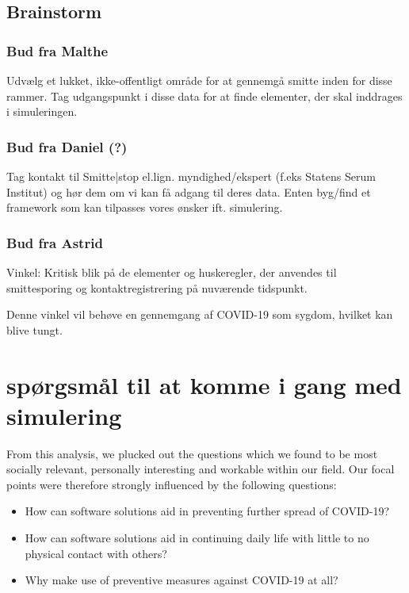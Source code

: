 \subsection{Brainstorm} 

\subsubsection{Bud fra Malthe}
Udvælg et lukket, ikke-offentligt område for at gennemgå smitte inden for disse rammer. 
Tag udgangspunkt i disse data for at finde elementer, der skal inddrages i simuleringen.


\subsubsection{Bud fra Daniel (?)}
Tag kontakt til Smitte|stop el.lign. myndighed/ekspert (f.eks Statens Serum Institut) og hør dem om vi kan få adgang til deres data.
Enten byg/find et framework som kan tilpasses vores ønsker ift. simulering. 


\subsubsection{Bud fra Astrid}
Vinkel:
Kritisk blik på de elementer og huskeregler, der anvendes til smittesporing og kontaktregistrering på nuværende tidspunkt.


Denne vinkel vil behøve en gennemgang af COVID-19 som sygdom, hvilket kan blive tungt.


\section{spørgsmål til at komme i gang med simulering}

From this analysis, we plucked out the questions which we found to be most socially relevant, personally interesting and workable within our field. Our focal points were therefore strongly influenced by the following questions:
\begin{itemize}
\item How can software solutions aid in preventing further spread of COVID-19?
\item How can software solutions aid in continuing daily life with little to no physical contact with others?
\item Why make use of preventive measures against COVID-19 at all?
\end{itemize}